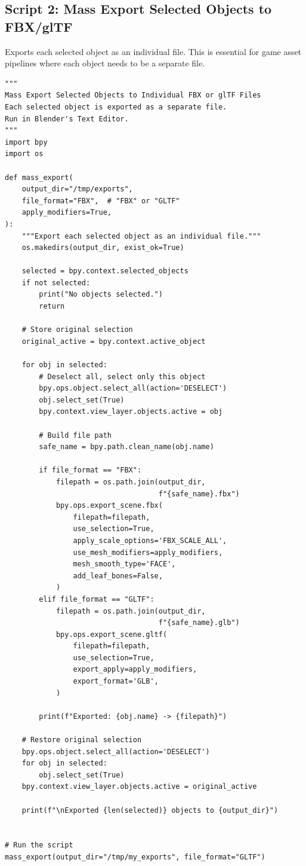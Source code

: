 \subsection{Script 2: Mass Export Selected Objects to FBX/glTF}

Exports each selected object as an individual file. This is essential for game asset pipelines where each object needs to be a separate file.

\begin{lstlisting}
"""
Mass Export Selected Objects to Individual FBX or glTF Files
Each selected object is exported as a separate file.
Run in Blender's Text Editor.
"""
import bpy
import os

def mass_export(
    output_dir="/tmp/exports",
    file_format="FBX",  # "FBX" or "GLTF"
    apply_modifiers=True,
):
    """Export each selected object as an individual file."""
    os.makedirs(output_dir, exist_ok=True)

    selected = bpy.context.selected_objects
    if not selected:
        print("No objects selected.")
        return

    # Store original selection
    original_active = bpy.context.active_object

    for obj in selected:
        # Deselect all, select only this object
        bpy.ops.object.select_all(action='DESELECT')
        obj.select_set(True)
        bpy.context.view_layer.objects.active = obj

        # Build file path
        safe_name = bpy.path.clean_name(obj.name)

        if file_format == "FBX":
            filepath = os.path.join(output_dir,
                                    f"{safe_name}.fbx")
            bpy.ops.export_scene.fbx(
                filepath=filepath,
                use_selection=True,
                apply_scale_options='FBX_SCALE_ALL',
                use_mesh_modifiers=apply_modifiers,
                mesh_smooth_type='FACE',
                add_leaf_bones=False,
            )
        elif file_format == "GLTF":
            filepath = os.path.join(output_dir,
                                    f"{safe_name}.glb")
            bpy.ops.export_scene.gltf(
                filepath=filepath,
                use_selection=True,
                export_apply=apply_modifiers,
                export_format='GLB',
            )

        print(f"Exported: {obj.name} -> {filepath}")

    # Restore original selection
    bpy.ops.object.select_all(action='DESELECT')
    for obj in selected:
        obj.select_set(True)
    bpy.context.view_layer.objects.active = original_active

    print(f"\nExported {len(selected)} objects to {output_dir}")


# Run the script
mass_export(output_dir="/tmp/my_exports", file_format="GLTF")
\end{lstlisting}

